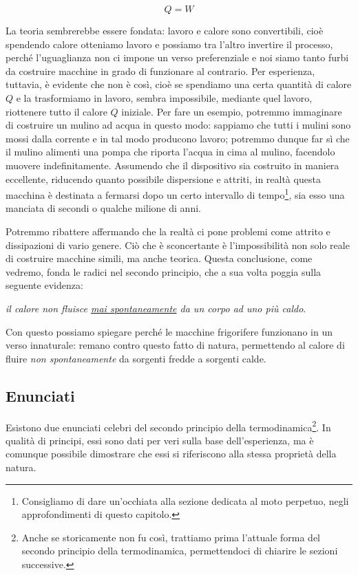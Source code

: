 \[ Q = W \]

\noindent La teoria sembrerebbe essere fondata: lavoro e calore sono
convertibili, cioè spendendo calore otteniamo lavoro e possiamo tra l'altro
invertire il processo, perché l'uguaglianza non ci impone un
verso preferenziale e noi siamo tanto furbi da costruire macchine
in grado di funzionare al contrario. Per esperienza, tuttavia, è evidente che non
è così, cioè se spendiamo una certa quantità di calore $Q$ e
la trasformiamo in lavoro, sembra impossibile, mediante quel lavoro,
riottenere tutto il calore $Q$ iniziale. Per fare un esempio, potremmo
immaginare di costruire un mulino ad acqua in questo modo: sappiamo che
tutti i mulini sono mossi dalla corrente e in tal modo producono
lavoro; potremmo dunque far sì che il mulino alimenti una pompa che
riporta l'acqua in cima al mulino, facendolo muovere indefinitamente.
Assumendo che il dispositivo sia costruito in maniera
eccellente, riducendo quanto possibile dispersione e attriti,
in realtà questa macchina è destinata a fermarsi dopo un certo
intervallo di tempo\footnote{Consigliamo di dare un'occhiata alla
sezione dedicata al moto perpetuo, negli approfondimenti di questo
capitolo.}, sia esso una manciata di secondi o qualche milione di
anni.

Potremmo ribattere affermando che la realtà ci pone problemi come
attrito e dissipazioni di vario genere. Ciò che è sconcertante è
l'impossibilità non solo reale di costruire macchine simili,
ma anche teorica. Questa conclusione, come vedremo, fonda
le radici nel secondo principio, che a sua volta poggia sulla
seguente evidenza:

\begin{center}
    \textit{il calore non fluisce \underline{\emph{mai spontaneamente}} da un corpo ad uno più caldo}.
\end{center}

\noindent Con questo possiamo spiegare perché le macchine frigorifere
funzionano in un verso innaturale: remano contro questo fatto di natura,
permettendo al calore di fluire \emph{non spontaneamente} da sorgenti
fredde a sorgenti calde.

\subsection{Enunciati}
Esistono due enunciati celebri del secondo principio della termodinamica\footnote{Anche se storicamente non fu così, trattiamo prima l'attuale forma
del secondo principio della termodinamica, permettendoci di chiarire
le sezioni successive.}.
In qualità di principi, essi sono dati per veri sulla base dell'esperienza,
ma è comunque possibile dimostrare che essi si riferiscono alla
stessa proprietà della natura.

